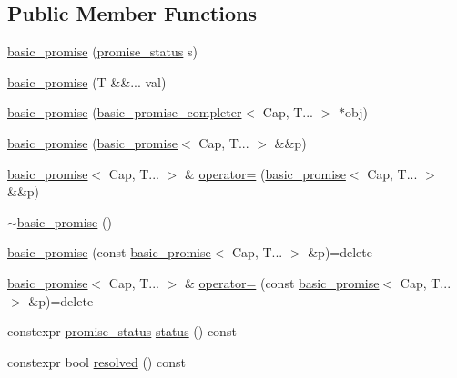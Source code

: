 \subsection*{Public Member Functions}
\begin{DoxyCompactItemize}
\item 
\hyperlink{classtelegen_1_1basic__promise_a2fc82b832b36b925b1c1fd42dd37cf40}{basic\+\_\+promise} (\hyperlink{namespacetelegen_a51e8b7480c7247182e2c6ca35e2c7504}{promise\+\_\+status} s)
\item 
\hyperlink{classtelegen_1_1basic__promise_a836472488ebd1d41cf9070420903848c}{basic\+\_\+promise} (T \&\&... val)
\item 
\hyperlink{classtelegen_1_1basic__promise_a6ac5ae1e598293c22075b8bd9b87bc6b}{basic\+\_\+promise} (\hyperlink{classtelegen_1_1basic__promise__completer}{basic\+\_\+promise\+\_\+completer}$<$ Cap, T... $>$ $\ast$obj)
\item 
\hyperlink{classtelegen_1_1basic__promise_a0c1f0ae0a200d107a8ab62afb48e6ffd}{basic\+\_\+promise} (\hyperlink{classtelegen_1_1basic__promise}{basic\+\_\+promise}$<$ Cap, T... $>$ \&\&p)
\item 
\hyperlink{classtelegen_1_1basic__promise}{basic\+\_\+promise}$<$ Cap, T... $>$ \& \hyperlink{classtelegen_1_1basic__promise_a6443a47f99ebe0c59bcff0d6312e491c}{operator=} (\hyperlink{classtelegen_1_1basic__promise}{basic\+\_\+promise}$<$ Cap, T... $>$ \&\&p)
\item 
\hyperlink{classtelegen_1_1basic__promise_afc06bee6b9672fce7cdbe0a29571223a}{$\sim$basic\+\_\+promise} ()
\item 
\hyperlink{classtelegen_1_1basic__promise_ad0b847d836f2cb8f15c4434b611c260f}{basic\+\_\+promise} (const \hyperlink{classtelegen_1_1basic__promise}{basic\+\_\+promise}$<$ Cap, T... $>$ \&p)=delete
\item 
\hyperlink{classtelegen_1_1basic__promise}{basic\+\_\+promise}$<$ Cap, T... $>$ \& \hyperlink{classtelegen_1_1basic__promise_acc3ccb6c4a41c043d4a39ee4c41c7c01}{operator=} (const \hyperlink{classtelegen_1_1basic__promise}{basic\+\_\+promise}$<$ Cap, T... $>$ \&p)=delete
\item 
constexpr \hyperlink{namespacetelegen_a51e8b7480c7247182e2c6ca35e2c7504}{promise\+\_\+status} \hyperlink{classtelegen_1_1basic__promise_ad792ccef6d5f06386d99f2899ee3fe0e}{status} () const
\item 
constexpr bool \hyperlink{classtelegen_1_1basic__promise_af8d6af8cd8f1966c6602891df69bfd70}{resolved} () const
\item 

\end{DoxyCompactItemize}
